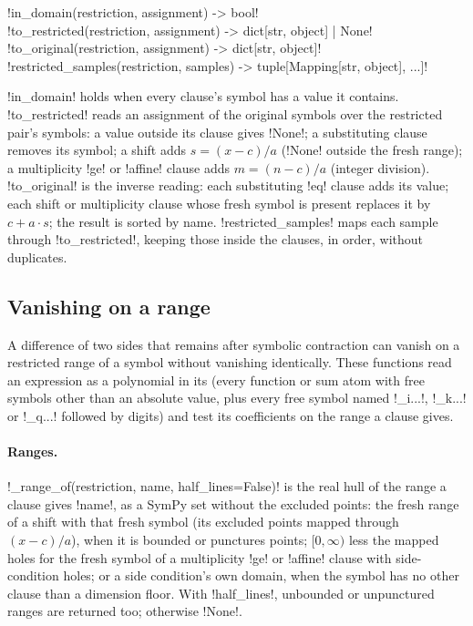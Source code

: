 \begin{signature}
\py!in_domain(restriction, assignment) -> bool!\\
\py!to_restricted(restriction, assignment) -> dict[str, object] | None!\\
\py!to_original(restriction, assignment) -> dict[str, object]!\\
\py!restricted_samples(restriction, samples) -> tuple[Mapping[str, object], ...]!
\end{signature}
\noindent \py!in_domain! holds when every clause's symbol has a value it contains. \py!to_restricted! reads an assignment of the original symbols over the restricted pair's symbols: a value outside its clause gives \py!None!; a substituting clause removes its symbol; a shift adds $s=(x-c)/a$ (\py!None! outside the fresh range); a multiplicity \code!ge! or \code!affine! clause adds $m=(n-c)/a$ (integer division). \py!to_original! is the inverse reading: each substituting \code!eq! clause adds its value; each shift or multiplicity clause whose fresh symbol is present replaces it by $c+a\cdot s$; the result is sorted by name. \py!restricted_samples! maps each sample through \py!to_restricted!, keeping those inside the clauses, in order, without duplicates.

\subsection{Vanishing on a range}

A difference of two sides that remains after symbolic contraction can vanish on a restricted range of a symbol without vanishing identically. These functions read an expression as a polynomial in its  (every function or sum atom with free symbols other than an absolute value, plus every free symbol named \code!_i...!, \code!_k...! or \code!_q...! followed by digits) and test its coefficients on the range a clause gives.

\paragraph{Ranges.} \py!_range_of(restriction, name, half_lines=False)! is the real hull of the range a clause gives \py!name!, as a SymPy set without the excluded points: the fresh range of a shift with that fresh symbol (its excluded points mapped through $(x-c)/a$), when it is bounded or punctures points; $[0,\infty)$ less the mapped holes for the fresh symbol of a multiplicity \code!ge! or \code!affine! clause with side-condition holes; or a side condition's own domain, when the symbol has no other clause than a dimension floor. With \py!half_lines!, unbounded or unpunctured ranges are returned too; otherwise \py!None!.

